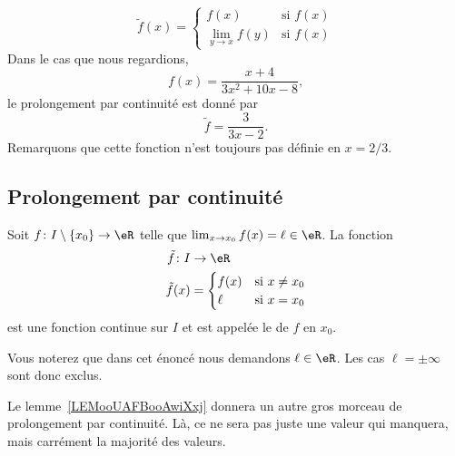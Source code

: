 \begin{equation}
\tilde f(x)=
\begin{cases}
f(x)            &\text{si }f(x)\\
\lim_{y\to x}f(y)   &\text{si }f(x)
\end{cases}
\end{equation}
Dans le cas que nous regardions,
\[
    f(x)=\frac{ x+4 }{ 3x^2+10x-8 },
\]
le prolongement par continuité est donné par
\begin{equation}
\tilde f =\frac{ 3 }{ 3x-2 }.
\end{equation}
Remarquons que cette fonction n'est toujours pas définie en $x=2/3$.

\subsection{Prolongement par continuité}

\begin{propositionDef}
    Soit \( f\colon I\setminus\{ x_0 \}\to \eR\) telle que \( \lim_{x\to x_{0}} f(x)=\ell\in \eR\). La fonction
    \begin{equation}
        \begin{aligned}
            \tilde f\colon I&\to \eR \\
            \tilde f(x)&=\begin{cases}
                f(x)    &   \text{si } x\neq x_0\\
                \ell    &    \text{si } x=x_0
            \end{cases}
        \end{aligned}
    \end{equation}
    est une fonction continue sur \( I\) et est appelée le  de \( f\) en \( x_0\).
\end{propositionDef}
Vous noterez que dans cet énoncé nous demandons \( \ell\in \eR\). Les cas \( \ell=\pm\infty\) sont donc exclus.

\begin{normaltext}
    Le lemme~\ref{LEMooUAFBooAwiXxj} donnera un autre gros morceau de prolongement par continuité. Là, ce ne sera pas juste une valeur qui manquera, mais carrément la majorité des valeurs.
\end{normaltext}

